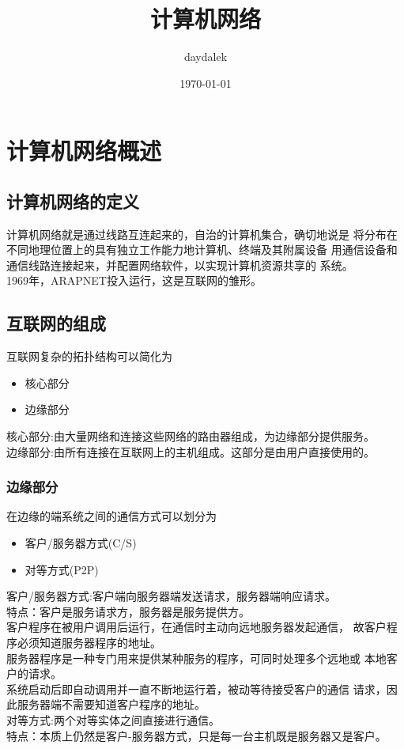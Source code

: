 \documentclass{ctexart}
\begin{document}
\title{计算机网络}
\author{daydalek}
\date{\today}
\maketitle
\section{计算机网络概述}
\subsection{计算机网络的定义}
计算机网络就是通过线路互连起来的，自治的计算机集合，确切地说是
将分布在不同地理位置上的具有独立工作能力地计算机、终端及其附属设备
用通信设备和通信线路连接起来，并配置网络软件，以实现计算机资源共享的
系统。\\
1969年，ARAPNET投入运行，这是互联网的雏形。
\subsection{互联网的组成}
互联网复杂的拓扑结构可以简化为\\
\begin{itemize}
    \item 核心部分
    \item 边缘部分
\end{itemize}
核心部分:由大量网络和连接这些网络的路由器组成，为边缘部分提供服务。\\
边缘部分:由所有连接在互联网上的主机组成。这部分是由用户直接使用的。\\
\subsubsection{边缘部分}
在边缘的端系统之间的通信方式可以划分为
\begin{itemize}
    \item 客户/服务器方式(C/S)
    \item 对等方式(P2P)
\end{itemize}
客户/服务器方式:客户端向服务器端发送请求，服务器端响应请求。\\
特点：客户是服务请求方，服务器是服务提供方。\\
客户程序在被用户调用后运行，在通信时主动向远地服务器发起通信，
故客户程序必须知道服务器程序的地址。\\
服务器程序是一种专门用来提供某种服务的程序，可同时处理多个远地或
本地客户的请求。\\
系统启动后即自动调用并一直不断地运行着，被动等待接受客户的通信
请求，因此服务器端不需要知道客户程序的地址。\\
对等方式:两个对等实体之间直接进行通信。\\
特点：本质上仍然是客户-服务器方式，只是每一台主机既是服务器又是客户。\\
\end{document}
